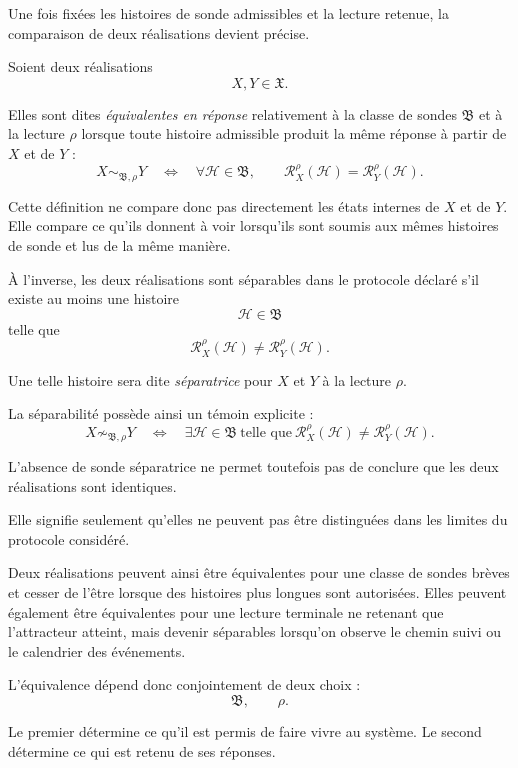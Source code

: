Une fois fixées les histoires de sonde admissibles et la lecture retenue, la comparaison de deux réalisations devient précise.

Soient deux réalisations
\[
X,Y\in\mathfrak X.
\]

Elles sont dites \emph{équivalentes en réponse} relativement à la classe de sondes \(\mathfrak B\) et à la lecture \(\rho\) lorsque toute histoire admissible produit la même réponse à partir de $X$ et de $Y$ :
\begin{equation}
\label{eq:t3-equivalence-observationnelle}
\boxed{
X\sim_{\mathfrak B,\rho}Y
\quad\Longleftrightarrow\quad
\forall\mathcal H\in\mathfrak B,
\qquad
\mathcal R_X^\rho(\mathcal H)
=
\mathcal R_Y^\rho(\mathcal H).
}
\end{equation}

Cette définition ne compare donc pas directement les états internes de $X$ et de $Y$. Elle compare ce qu'ils donnent à voir lorsqu'ils sont soumis aux mêmes histoires de sonde et lus de la même manière.

À l'inverse, les deux réalisations sont séparables dans le protocole déclaré s'il existe au moins une histoire
\[
\mathcal H\in\mathfrak B
\]
telle que
\[
\mathcal R_X^\rho(\mathcal H)
\neq
\mathcal R_Y^\rho(\mathcal H).
\]

Une telle histoire sera dite \emph{séparatrice} pour $X$ et $Y$ à la lecture $\rho$.

La séparabilité possède ainsi un témoin explicite :
\[
X\not\sim_{\mathfrak B,\rho}Y
\quad\Longleftrightarrow\quad
\exists\mathcal H\in\mathfrak B
\ \text{telle que}\
\mathcal R_X^\rho(\mathcal H)
\neq
\mathcal R_Y^\rho(\mathcal H).
\]

L'absence de sonde séparatrice ne permet toutefois pas de conclure que les deux réalisations sont identiques.

Elle signifie seulement qu'elles ne peuvent pas être distinguées dans les limites du protocole considéré.

Deux réalisations peuvent ainsi être équivalentes pour une classe de sondes brèves et cesser de l'être lorsque des histoires plus longues sont autorisées. Elles peuvent également être équivalentes pour une lecture terminale ne retenant que l'attracteur atteint, mais devenir
séparables lorsqu'on observe le chemin suivi ou le calendrier des événements.

L'équivalence dépend donc conjointement de deux choix :
\[
\mathfrak B,
\qquad
\rho.
\]

Le premier détermine ce qu'il est permis de faire vivre au système. Le second détermine ce qui est retenu de ses réponses.


